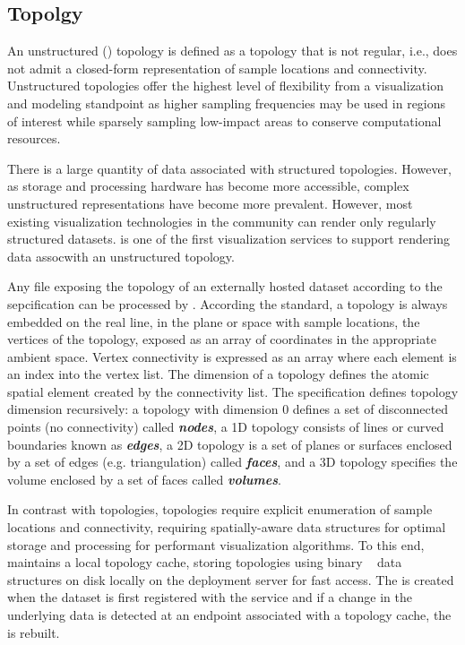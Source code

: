 \subsection{\ugrid{} Topolgy}
An unstructured (\ugrid{}) topology is defined as a topology that is
not regular, i.e., does not admit a closed-form representation of
sample locations and connectivity. Unstructured topologies offer the
highest level of flexibility from a visualization and modeling
standpoint as higher sampling frequencies may be used in regions of
interest while sparsely sampling low-impact areas to conserve
computational resources. 

There is a large quantity of \cf{} data associated with structured
topologies. However, as storage and processing hardware has become
more accessible, complex unstructured representations have become more
prevalent. However, most existing visualization technologies in the
\cf{} community can render only regularly structured
datasets. \sciwms{} is one of the first visualization services to
support rendering data assocwith an unstructured topology.

Any \ncml{} file exposing the topology of an externally hosted dataset
according to the \cfugrid{} sepcification can be processed by
\sciwms{}. According the \cfugrid{} standard, a topology is always
embedded on the real line, in the plane or space with sample
locations, the vertices of the topology, exposed as an array of
coordinates in the appropriate ambient space. Vertex connectivity is
expressed as an array where each element is an index into the vertex
list. The dimension of a topology defines the atomic spatial element
created by the connectivity list. The \cfugrid{} specification defines
topology dimension recursively: a topology with dimension 0 defines a
set of disconnected points (no connectivity) called
\textbf{\textit{nodes}}, a 1D topology consists of lines or curved
boundaries known as \textbf{\textit{edges}}, a 2D topology is a set of
planes or surfaces enclosed by a set of edges (e.g. triangulation)
called \textbf{\textit{faces}}, and a 3D topology specifies the volume
enclosed by a set of faces called \textbf{\textit{volumes}}.

In contrast with \cgrid{} topologies, \ugrid{} topologies require
explicit enumeration of sample locations and connectivity, requiring
spatially-aware data structures for optimal storage and processing for
performant visualization algorithms. To this end, \sciwms{} maintains
a local topology cache, storing \ugrid{} topologies using binary
\rtree{}~\cite{Guttman84} data structures on disk locally on the
deployment server for fast access. The \rtree{} is created when the
dataset is first registered with the \sciwms{} service and if a change
in the underlying data is detected at an endpoint associated with a
topology cache, the \rtree{} is rebuilt.
